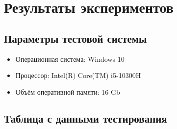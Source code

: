 \documentclass[a4paper,12pt]{article}
\begin{document}
\section{Результаты экспериментов}
\subsection{Параметры тестовой системы}
\begin{itemize}
    \item Операционная система: Windows 10
    \item Процессор: Intel(R) Core(TM) i5-10300H
    \item Объём оперативной памяти: 16 Gb
\end{itemize}
\newpage
\subsection{Таблица с данными тестирования}
\end{document}
